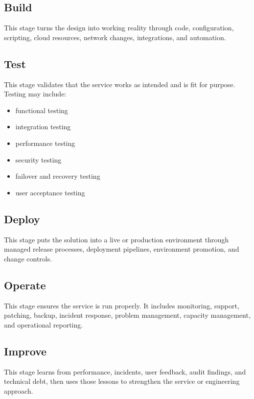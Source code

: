 \documentclass[
  british,
  letterpaper,
  DIV=11,
  numbers=noendperiod]{scrartcl}
\providecommand{\tightlist}{%
  \setlength{\itemsep}{0pt}\setlength{\parskip}{0pt}}
\begin{document}
\subsection{Build}\label{build}

This stage turns the design into working reality through code,
configuration, scripting, cloud resources, network changes,
integrations, and automation.

\subsection{Test}\label{test}

This stage validates that the service works as intended and is fit for
purpose. Testing may include:

\begin{itemize}
\tightlist
\item
  functional testing
\item
  integration testing
\item
  performance testing
\item
  security testing
\item
  failover and recovery testing
\item
  user acceptance testing
\end{itemize}

\subsection{Deploy}\label{deploy}

This stage puts the solution into a live or production environment
through managed release processes, deployment pipelines, environment
promotion, and change controls.

\subsection{Operate}\label{operate}

This stage ensures the service is run properly. It includes monitoring,
support, patching, backup, incident response, problem management,
capacity management, and operational reporting.

\subsection{Improve}\label{improve}

This stage learns from performance, incidents, user feedback, audit
findings, and technical debt, then uses those lessons to strengthen the
service or engineering approach.
\end{document}
